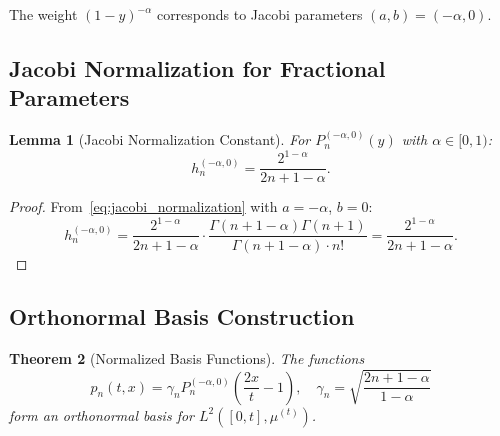\documentclass{article}
\theoremstyle{plain}
\newtheorem{theorem}{Theorem}[section]
\newtheorem{lemma}[theorem]{Lemma}
\theoremstyle{definition}
\theoremstyle{remark}
\begin{document}
The weight $(1 - y)^{-\alpha}$ corresponds to Jacobi parameters $(a, b) = (-\alpha, 0)$.

\subsection{Jacobi Normalization for Fractional Parameters}

\begin{lemma}[Jacobi Normalization Constant]
	\label{lem:jacobi_norm}
	For $P_n^{(-\alpha, 0)}(y)$ with $\alpha \in [0, 1)$:
	\begin{equation}
		h_n^{(-\alpha, 0)} = \frac{2^{1-\alpha}}{2n + 1 - \alpha}.
	\end{equation}
\end{lemma}

\begin{proof}
	From~\eqref{eq:jacobi_normalization} with $a = -\alpha$, $b = 0$:
	\begin{equation}
		h_n^{(-\alpha, 0)} = \frac{2^{1-\alpha}}{2n + 1 - \alpha} \cdot \frac{\Gamma(n + 1 - \alpha)\Gamma(n + 1)}{\Gamma(n + 1 - \alpha) \cdot n!} = \frac{2^{1-\alpha}}{2n + 1 - \alpha}.
	\end{equation}
\end{proof}

\subsection{Orthonormal Basis Construction}

\begin{theorem}[Normalized Basis Functions]
	\label{thm:basis_functions}
	The functions
	\begin{equation}
		p_n(t, x) = \gamma_n P_n^{(-\alpha, 0)}\left(\frac{2x}{t} - 1\right), \quad \gamma_n = \sqrt{\frac{2n + 1 - \alpha}{1 - \alpha}}
	\end{equation}
	form an orthonormal basis for $L^2([0,t], \mu^{(t)})$.
\end{theorem}
\end{document}
